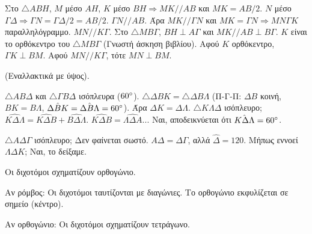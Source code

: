 \documentclass[11pt,a4paper,modern]{FFExercises}
\begin{document}
\begin{alist}
    \item Στο $\triangle ABH$, $M$ μέσο $AH$, $K$ μέσο $BH \Rightarrow MK // AB$ και $MK=AB/2$.
    $N$ μέσο $\varGamma\Delta \Rightarrow \varGamma N = \varGamma\Delta/2 = AB/2$. $\varGamma N // AB$.
    Άρα $MK // \varGamma N$ και $MK=\varGamma N \Rightarrow MN\varGamma K$ παραλληλόγραμμο.
    $MN // K\varGamma$.
    Στο $\triangle MB\varGamma$, $BH \perp A\varGamma$ και $MK // AB \perp B\varGamma$.
    $K$ είναι το ορθόκεντρο του $\triangle MB\varGamma$ (Γνωστή άσκηση βιβλίου).
    Αφού $K$ ορθόκεντρο, $\varGamma K \perp BM$.
    Αφού $MN // K\varGamma$, τότε $MN \perp BM$.
    \item (Εναλλακτικά με ύψος).
\end{alist}

\begin{alist}
    \item $\triangle AB\Delta$ και $\triangle \varGamma B\Delta$ ισόπλευρα ($60\degree$).
    $\triangle \Delta BK = \triangle \Delta B \Lambda$ (Π-Γ-Π: $\Delta B$ κοινή, $BK=B\Lambda$, $\hat{\Delta BK}=\hat{\Delta B\Lambda}=60\degree$).
    Άρα $\Delta K=\Delta \Lambda$. $\triangle K\Lambda \Delta$ ισόπλευρο;
    $\hat{K \Delta \Lambda} = \hat{K\Delta B} + \hat{B\Delta \Lambda}$.
    $\hat{K\Delta B} = \hat{\Lambda \Delta A}$...
    Ναι, αποδεικνύεται ότι $\hat{K\Delta \Lambda} = 60\degree$.
    \item $\triangle A\Delta \varGamma$ ισόπλευρο; Δεν φαίνεται σωστό. $A\Delta = \Delta \varGamma$, αλλά $\hat{\Delta}=120$.
    Μήπως εννοεί $\Lambda \Delta K$; Ναι, το δείξαμε.
\end{alist}

\begin{alist}
    \item Οι διχοτόμοι σχηματίζουν ορθογώνιο.
    \item Αν ρόμβος: Οι διχοτόμοι ταυτίζονται με διαγώνιες. Το ορθογώνιο εκφυλίζεται σε σημείο (κέντρο).
    \item Αν ορθογώνιο: Οι διχοτόμοι σχηματίζουν τετράγωνο.
\end{alist}
\end{document}
